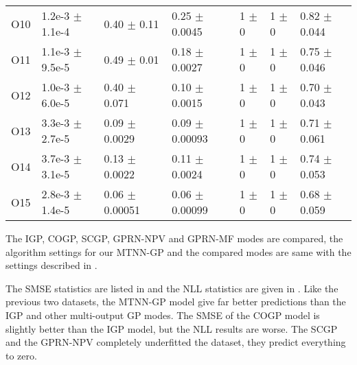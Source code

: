 \begin{table}[!htb]
\begin{tabular}{lllllll}
        O10    &  1.2e-3 $\pm$  1.1e-4 &  0.40 $\pm$  0.11     &  0.25 $\pm$  0.0045   &  1  $\pm$  0  &  1  $\pm$  0 &  0.82 $\pm$  0.044 \\
        O11    &  1.1e-3 $\pm$  9.5e-5 &  0.49 $\pm$  0.01     &  0.18 $\pm$  0.0027   &  1  $\pm$  0  &  1  $\pm$  0 &  0.75 $\pm$  0.046 \\
        O12    &  1.0e-3 $\pm$  6.0e-5 &  0.40 $\pm$  0.071    &  0.10 $\pm$  0.0015   &  1  $\pm$  0  &  1  $\pm$  0 &  0.70 $\pm$  0.043 \\
        O13    &  3.3e-3 $\pm$  2.7e-5 &  0.09 $\pm$  0.0029   &  0.09 $\pm$  0.00093  &  1  $\pm$  0  &  1  $\pm$  0 &  0.71 $\pm$  0.061 \\
        O14    &  3.7e-3 $\pm$  3.1e-5 &  0.13 $\pm$  0.0022   &  0.11 $\pm$  0.0024   &  1  $\pm$  0  &  1  $\pm$  0 &  0.74 $\pm$  0.053 \\
        O15    &  2.8e-3 $\pm$  1.4e-5 &  0.06 $\pm$  0.00051  &  0.06 $\pm$  0.00099  &  1  $\pm$  0  &  1  $\pm$  0 &  0.68 $\pm$  0.059 \\
        \bottomrule
    \end{tabular}
\end{table}

The IGP, COGP, SCGP, GPRN-NPV and GPRN-MF modes are compared, the algorithm settings for our MTNN-GP and the compared modes are same with the settings described in . 

The SMSE statistics are listed in  and the NLL statistics are given in . Like the previous two datasets, the MTNN-GP model give far better predictions than the IGP and other multi-output GP modes. The SMSE of the COGP model is slightly better than the IGP model, but the NLL results are worse. The SCGP and the GPRN-NPV completely underfitted the dataset, they predict everything to zero.


